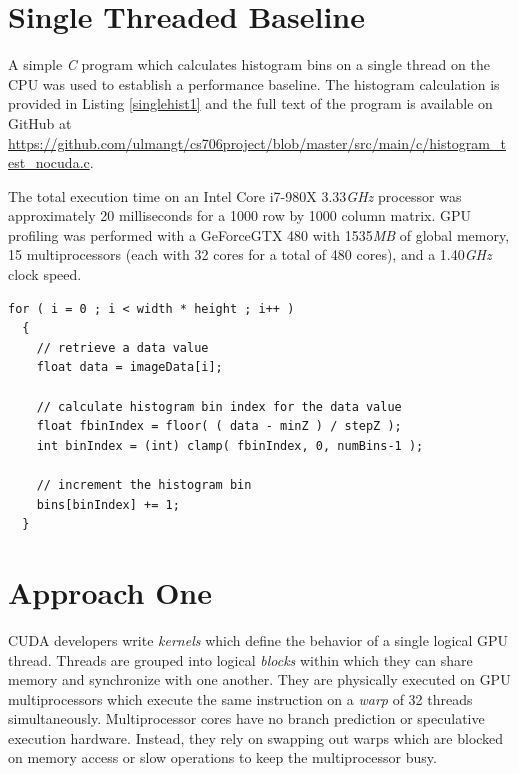 \documentclass{article}
\begin{document}
\section{Single Threaded Baseline}\label{baseline}

A simple \emph{C} program which calculates histogram bins on a single thread on the CPU was used to establish a performance baseline. The histogram calculation is provided in Listing \ref{singlehist1} and the full text of the program is available on GitHub at \url{https://github.com/ulmangt/cs706project/blob/master/src/main/c/histogram_test_nocuda.c}.

The total execution time on an Intel Core i7-980X 3.33\emph{GHz} processor was approximately 20 milliseconds for a 1000 row by 1000 column matrix. GPU profiling was performed with a GeForceGTX 480 with 1535\emph{MB} of global memory, 15 multiprocessors (each with 32 cores for a total of 480 cores), and a 1.40\emph{GHz} clock speed\cite{geforce480}.

\lstset{language=C,basicstyle=\footnotesize}
\begin{minipage}{\textwidth}
\begin{lstlisting}[caption={Single Threaded Histogram Calculation},label={singlehist1}]
  for ( i = 0 ; i < width * height ; i++ )
  {
    // retrieve a data value
    float data = imageData[i];

    // calculate histogram bin index for the data value
    float fbinIndex = floor( ( data - minZ ) / stepZ );
    int binIndex = (int) clamp( fbinIndex, 0, numBins-1 );

    // increment the histogram bin
    bins[binIndex] += 1;
  }
\end{lstlisting}
\end{minipage}

\section{Approach One}\label{approach1}

CUDA developers write \emph{kernels} which define the behavior of a single logical GPU thread. Threads are grouped into logical \emph{blocks} within which they can share memory and synchronize with one another. They are physically executed on GPU multiprocessors which execute the same instruction on a \emph{warp} of 32 threads simultaneously. Multiprocessor cores have no branch prediction or speculative execution hardware. Instead, they rely on swapping out warps which are blocked on memory access or slow operations to keep the multiprocessor busy. 
\end{document}
